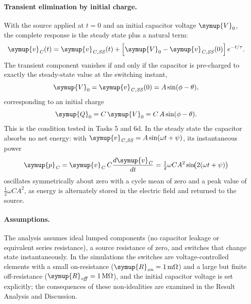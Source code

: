 \documentclass[12pt,a4paper]{article}
\begin{document}
	\paragraph{Transient elimination by initial charge.}
	With the source applied at $t = 0$ and an initial capacitor voltage
	$\symup{V}_{0}$, the complete response is the steady state plus a natural term:
	\begin{equation}
		\symup{v}_{\mathit{C}}(t) = \symup{v}_{\mathit{C,SS}}(t)
		+ \left[\symup{V}_{0} - \symup{v}_{\mathit{C,SS}}(0)\right] e^{-t/\tau}.
		\label{eq:complete-sine}
	\end{equation}
	The transient component vanishes if and only if the capacitor is
	pre-charged to exactly the steady-state value at the switching
	instant,
	\begin{equation}
		\symup{V}_{0} = \symup{v}_{\mathit{C,SS}}(0) = A \sin(\phi - \theta),
		\label{eq:ic-cond}
	\end{equation}
	corresponding to an initial charge
	\begin{equation}
		\symup{Q}_{0} = C\,\symup{V}_{0} = C\,A\sin(\phi - \theta).
		\label{eq:q0}
	\end{equation}
	This is the condition tested in Tasks 5 and 6d.  In the steady state
	the capacitor absorbs no net energy: with
	$\symup{v}_{\mathit{C,SS}} = A\sin(\omega t + \psi)$, its instantaneous power
	\begin{equation}
		\symup{p}_{\mathit{C}} = \symup{v}_{\mathit{C}}\,C\frac{d\symup{v}_{\mathit{C}}}{dt}
		= \tfrac{1}{2}\omega C A^{2}\sin\!\bigl(2(\omega t + \psi)\bigr)
		\label{eq:pcap}
	\end{equation}
	oscillates symmetrically about zero with a cycle mean of zero and a
	peak value of $\tfrac{1}{2}\omega C A^{2}$, as energy is alternately
	stored in the electric field and returned to the source.
	
	\paragraph{Assumptions.}
	The analysis assumes ideal lumped components (no capacitor leakage or
	equivalent series resistance), a source resistance of zero, and
	switches that change state instantaneously.  In the simulations the
	switches are voltage-controlled elements with a small on-resistance
	($\symup{R}_{\mathit{on}} = \SI{1}{\milli\ohm}$) and a large but finite
	off-resistance ($\symup{R}_{\mathit{off}} = \SI{1}{\mega\ohm}$), and the initial
	capacitor voltage is set explicitly; the consequences of these
	non-idealities are examined in the Result Analysis and Discussion.
	
\end{document}
